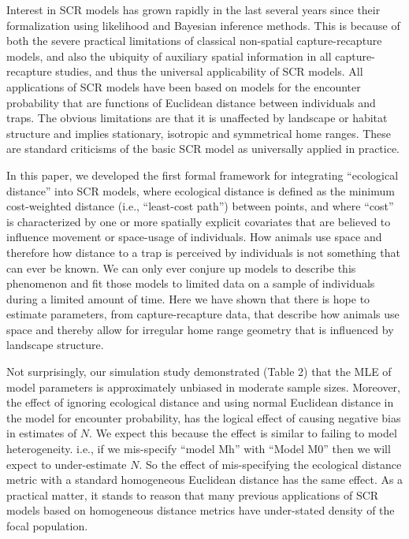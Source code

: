 \documentclass[12pt]{article}
\begin{document}
\begin{spacing}{1.8}
Interest in SCR models has grown rapidly in the last several years
since their formalization using likelihood
\citep{borchers_efford:2008} and Bayesian \citep{royle_young:2008}
inference methods. This is because of both the severe practical
limitations of classical non-spatial capture-recapture models, and
also the ubiquity of auxiliary spatial information in all
capture-recapture studies, and thus the universal applicability of SCR
models.
All applications of SCR models have been based on models for the
encounter probability that are functions of Euclidean
distance between individuals and traps. The obvious limitations are
that it is unaffected by landscape or habitat structure and implies
stationary, isotropic and symmetrical home ranges. These are standard
criticisms of the basic SCR model as universally applied in practice.

In this paper, we developed the first formal framework for integrating
``ecological distance'' into SCR models, where ecological distance is
defined as the minimum cost-weighted distance (i.e., ``least-cost
path'') between points, and where ``cost'' is characterized by one or
more spatially explicit covariates that are believed to influence
movement or space-usage of individuals.
How animals use space and therefore how distance to a trap is
perceived by individuals is not something that can ever be known. We
can only ever conjure up models to describe this phenomenon and fit
those models to limited data on a sample of individuals during a
limited amount of time.  Here we have shown that there is hope to
estimate parameters, from capture-recapture data, that describe how
animals use space and thereby allow for irregular home range geometry
that is influenced by landscape structure.

Not surprisingly, our simulation study demonstrated
(Table 2) that the MLE of model parameters is
approximately unbiased in moderate sample sizes. Moreover, the effect
of ignoring ecological distance and using normal Euclidean distance in
the model for encounter probability, has the logical effect of causing
negative bias in estimates of $N$.  We expect this because the effect
is similar to failing to model heterogeneity. i.e., if we mis-specify
``model Mh'' with ``Model M0''
\citep{otis_etal:1978} then we will expect to under-estimate $N$. So
the effect of mis-specifying the ecological distance metric with a
standard homogeneous Euclidean distance has the same effect. As a
practical matter, it stands to reason that many previous applications
of SCR models based on homogeneous distance metrics have under-stated
density of the focal population.


\end{spacing}
\end{document}
